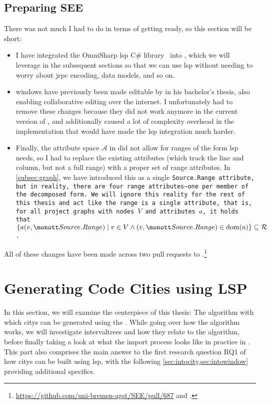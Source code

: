 \documentclass[../thesis]{subfiles}
\begin{document}
\subsection{Preparing SEE}
There was not much I had to do in terms of getting \SEE{} ready, so this section will be short:
\begin{itemize}
	\item I have integrated the OmniSharp \gls{lsp} C\# library~\cite{csharplanguageserverprotocol2023} into \SEE{}, which we will leverage in the subsequent sections so that we can use \gls{lsp} without needing to worry about \gls{jrpc} encoding, data models, and so on.
	\item \Glspl{window} have previously been made editable by \textcite{moritz} in his bachelor's thesis, also enabling collaborative editing over the internet.
	      I unfortunately had to remove these changes because they did not work anymore in the current version of \SEE{}, and additionally caused a lot of complexity overhead in the  implementation that would have made the \gls{lsp} integration much harder.
	\item Finally, the attribute space $\mathcal{A}$ in \SEE{} did not allow for \glspl{range} of the form \gls{lsp} needs, so I had to replace the existing attributes (which track the line and column, but not a full range) with a proper set of \gls{range} attributes.
	      In \cref{subsec:graph}, we have introduced this as a single \tt{Source.Range} attribute, but in reality, there are four \gls{range} attributes---one per member of the decomposed form.
	      We will ignore this reality for the rest of this thesis and act like the \gls{range} is a single attribute, that is, for all project graphs with nodes $V$ and attributes $a$, it holds that $\{a(v, \tt{Source.Range}) \mid v \in V \land (v, \tt{Source.Range}) \in \mathrm{dom}(a) \} \subseteq \mathcal{R}$.
\end{itemize}

All of these changes have been made across two pull requests to \SEE{}.\footnote{
	\url{https://github.com/uni-bremen-agst/SEE/pull/687} and .
}

\section{Generating Code Cities using LSP}\label{sec:generate}
In this section, we will examine the centerpiece of this thesis:
The algorithm with which \glspl{city} can be generated using the .
While going over how the algorithm works, we will investigate \glspl{intervaltree} and how they relate to the algorithm, before finally taking a look at what the import process looks like in practice in \SEE{}.
This part also comprises the main answer to the first research question \textsf{RQ1} of how \glspl{city} can be built using \gls{lsp}, with the following \cref{sec:intocity,sec:intowindow} providing additional specifics.
\end{document}
